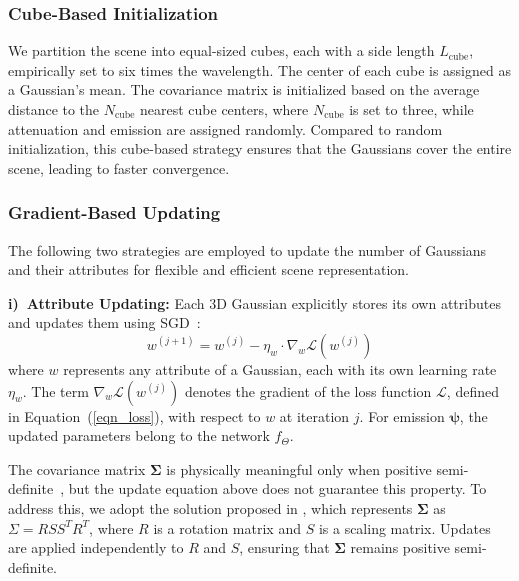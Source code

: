 \subsubsection{Cube-Based Initialization}
We partition the scene into equal-sized cubes, each with a side length \( L_{\text{cube}} \), empirically set to six times the wavelength.  
The center of each cube is assigned as a Gaussian's mean.  
The covariance matrix is initialized based on the average distance to the \( N_{\text{cube}} \) nearest cube centers, where \( N_{\text{cube}} \) is set to three, while attenuation and emission are assigned randomly.
Compared to random initialization, this cube-based strategy ensures that the Gaussians cover the entire scene, leading to faster convergence.



\subsubsection{Gradient-Based Updating}
The following two strategies are employed to update the number of Gaussians and their attributes for flexible and efficient scene representation.


\textbf{i)~Attribute Updating:}
Each 3D Gaussian explicitly stores its own attributes and updates them using SGD~\cite{amari1993backpropagation}:
\begin{equation}
\label{eqn_updating}
w^{\left(j+1\right)} = w^{\left(j\right)} - \eta_{w} \cdot \nabla_{w} \mathcal{L}\left(w^{\left(j\right)}\right)
\end{equation}
where \(w\) represents any attribute of a Gaussian, each with its own learning rate \(\eta_{w}\).  
The term \(\nabla_{w} \mathcal{L}\left(w^{(j)}\right)\) denotes the gradient of the loss function \(\mathcal{L}\), defined in Equation~(\ref{eqn_loss}), with respect to \(w\) at iteration \(j\).  
For emission \(\boldsymbol{\psi}\), the updated parameters belong to the network \(f_\Theta\).

The covariance matrix \(\boldsymbol{\Sigma}\) is physically meaningful only when positive semi-definite~\cite{de2011strict}, but the update equation above does not guarantee this property.  
To address this, we adopt the solution proposed in \cite{kerbl20233d}, which represents \(\boldsymbol{\Sigma}\) as \(\Sigma = R S S^{T} R^{T}\), where \(R\) is a rotation matrix and \(S\) is a scaling matrix.  
Updates are applied independently to \(R\) and \(S\), ensuring that \(\boldsymbol{\Sigma}\) remains positive semi-definite.



